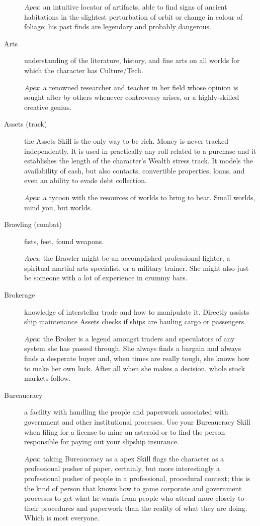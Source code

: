 \begin{description}
\emph{Apex}: an intuitive locator of artifacts, able to find signs of ancient habitations in the slightest perturbation of orbit or change in colour of foliage; his past finds are legendary and probably dangerous.

\item[Arts]
understanding of the literature, history, and fine arts on all worlds for which the character has Culture/Tech.

\emph{Apex}: a renowned researcher and teacher in her field whose opinion is sought after by others whenever controversy arises, or a highly-skilled creative genius.

\item[Assets (track)]
the Assets Skill is the only way to be rich. Money is never tracked independently. It is used in practically any roll related to a purchase and it establishes the length of the character's Wealth stress track. It models the availability of cash, but also contacts, convertible properties, loans, and even an ability to evade debt collection.

\emph{Apex}: a tycoon with the resources of worlds to bring to bear. Small worlds, mind you, but worlds.

\item[Brawling (combat)]
fists, feet, found weapons.

\emph{Apex}: the Brawler might be an accomplished professional fighter, a spiritual martial arts specialist, or a military trainer. She might also just be someone with a lot of experience in crummy bars.

\item[Brokerage]
knowledge of interstellar trade and how to manipulate it. Directly assists ship maintenance Assets checks if ships are hauling cargo or passengers.

\emph{Apex}: the Broker is a legend amongst traders and speculators of any system she has passed through. She always finds a bargain and always finds a desperate buyer and, when times are really tough, she knows how to make her own luck. After all when she makes a decision, whole stock markets follow.

\item[Bureaucracy]
a facility with handling the people and paperwork associated with government and other institutional processes. Use your Bureaucracy Skill when filing for a license to mine an asteroid or to find the person responsible for paying out your slipship insurance.

\emph{Apex}: taking Bureaucracy as a apex Skill flags the character as a professional pusher of paper, certainly, but more interestingly a professional pusher of people in a professional, procedural context; this is the kind of person that knows how to game corporate and government processes to get what he wants from people who attend more closely to their procedures and paperwork than the reality of what they are doing. Which is most everyone.


\end{description}
